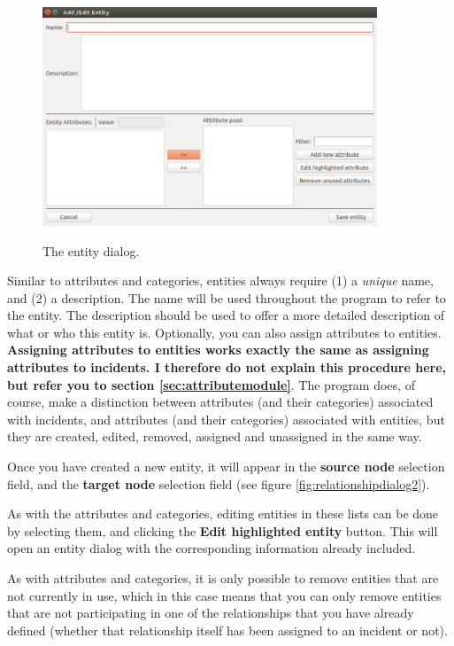 \documentclass{memoir}
\begin{document}
\begin{figure}[h!]
  \centering
  \caption{The entity dialog.}
  \includegraphics[width=100mm]{Screenshot_16.pdf}
  \label{fig:entitydialog}
\end{figure}

Similar to attributes and categories, entities always require (1) a \emph{unique} name, and (2) a description. The name will be used throughout the program to refer to the entity. The description should be used to offer a more detailed description of what or who this entity is. Optionally, you can also assign attributes to entities. \textbf{Assigning attributes to entities works exactly the same as assigning attributes to incidents. I therefore do not explain this procedure here, but refer you to section \ref{sec:attributemodule}}. The program does, of course, make a distinction between attributes (and their categories) associated with incidents, and attributes (and their categories) associated with entities, but they are created, edited, removed, assigned and unassigned in the same way.  

Once you have created a new entity, it will appear in the \textbf{source node} selection field, and the \textbf{target node} selection field (see figure \ref{fig:relationshipdialog2}).

As with the attributes and categories, editing entities in these lists can be done by selecting them, and clicking the \textbf{Edit highlighted entity} button. This will open an entity dialog with the corresponding information already included. 

As with attributes and categories, it is only possible to remove entities that are not currently in use, which in this case means that you can only remove entities that are not participating in one of the relationships that you have already defined (whether that relationship itself has been assigned to an incident or not).
\end{document}
